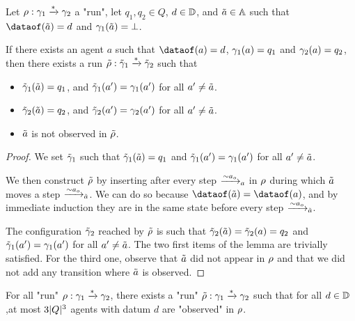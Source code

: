 \begin{lemma}
	\label{lem:agents-copycat}
	Let  $\run : \config_1 \xrightarrow{*} \config_2$ a "run", let $q_1, q_2 \in Q$,  $d \in \Dataset$, and  $\Tilde{a} \in \Agentset$ such that $\dataof(\Tilde{a}) = d$ and $\config_1(\Tilde{a}) = \bot$. 
	
	If there exists an agent $a$ such that $\dataof(a)=d$, $\config_1(a) = q_1$ and $\config_2(a) = q_2$, then there exists a run $\Tilde{\run} : \Tilde{\config}_1 \xrightarrow{*} \Tilde{\config}_2$ such that
	\begin{itemize}
		\item $\Tilde{\config}_1(\Tilde{a}) = q_1$, and $\Tilde{\config}_1(a') = \config_1(a')$ for all $a' \neq \Tilde{a}$.
		
		\item $\Tilde{\config}_2(\Tilde{a}) = q_2$, and $\Tilde{\config}_2(a') = \config_2(a')$ for all $a' \neq \Tilde{a}$.
		
		\item $\Tilde{a}$ is not observed in $\Tilde{\run}$.
	\end{itemize}
\end{lemma}

\begin{proof}
	We set $\Tilde{\config}_1$ such that $\Tilde{\config}_1(\Tilde{a}) = q_1$ and $\Tilde{\config}_1(a') = \config_1(a')$ for all $a' \neq \Tilde{a}$.
	
	We then construct $\Tilde{\run}$ by inserting after every step $\step{\sim}{a}{a_o}$ in $\run$ during which $\Tilde{a}$ moves a step
	$\step{\sim}{\Tilde{a}}{a_o}$.
	We can do so because $\dataof(\Tilde{a})=\dataof(a)$, and by immediate induction they are in the same state before every step $\step{\sim}{\Tilde{a}}{a_o}$.
	
	The configuration $\Tilde{\config}_2$ reached by $\Tilde{\run}$ is such that $\Tilde{\config}_2(\Tilde{a}) = \Tilde{\config}_2(a) = q_2$ and $\Tilde{\config}_1(a') = \config_1(a')$ for all $a' \neq \Tilde{a}$. The two first items of the lemma are trivially satisfied.
	For the third one, observe that $\Tilde{a}$ did not appear in $\run$ and that we did not add any transition where $\Tilde{a}$ is observed.
\end{proof}


\begin{corollary}
	For all "run" $\run : \config_1 \xrightarrow{*} \config_2$, there exists a "run" $\Tilde{\run} : \config_1 \xrightarrow{*} \config_2$ such that for all $d \in \Dataset$,at most $3\size{Q}^3$ agents with datum $d$ are "observed" in $\run$.
\end{corollary}

